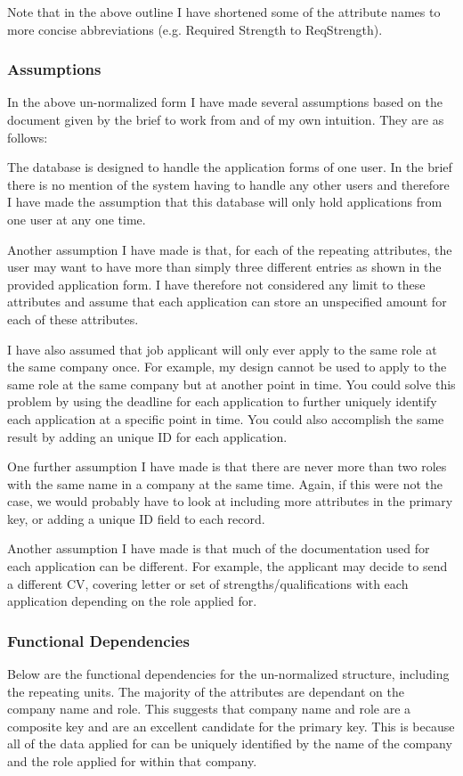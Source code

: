 \documentclass{article}
\begin{document}
Note that in the above outline I have shortened some of the attribute names to more concise abbreviations (e.g. Required Strength to ReqStrength).

\subsubsection{Assumptions}

In the above un-normalized form I have made several assumptions based on the document given by the brief to work from and of my own intuition. They are as follows:

The database is designed to handle the application forms of one user. In the brief there is no mention of the system having to handle any other users and therefore I have made the assumption that this database will only hold applications from one user at any one time.

Another assumption I have made is that, for each of the repeating attributes, the user may want to have more than simply three different entries as shown in the provided application form. I have therefore not considered any limit to these attributes and assume that each application can store an unspecified amount for each of these attributes.

I have also assumed that job applicant will only ever apply to the same role at the same company once. For example, my design cannot be used to apply to the same role at the same company but at another point in time. You could solve this problem by using the deadline for each application to further uniquely identify each application at a specific point in time. You could also accomplish the same result by adding an unique ID for each application.

One further assumption I have made is that there are never more than two roles with the same name in a company at the same time. Again, if this were not the case, we would probably have to look at including more attributes in the primary key, or adding a unique ID field to each record.

Another assumption I have made is that much of the documentation used for each application can be different. For example, the applicant may decide to send a different CV, covering letter or set of strengths/qualifications with each application depending on the role applied for.

\subsubsection{Functional Dependencies}
\label{sec:func}
Below are the functional dependencies for the un-normalized structure, including the repeating units. The majority of the attributes are dependant on the company name and role. This suggests that company name and role are a composite key and are an excellent candidate for the primary key. This is because all of the data applied for can be uniquely identified by the name of the company and the role applied for within that company. 
\end{document}
